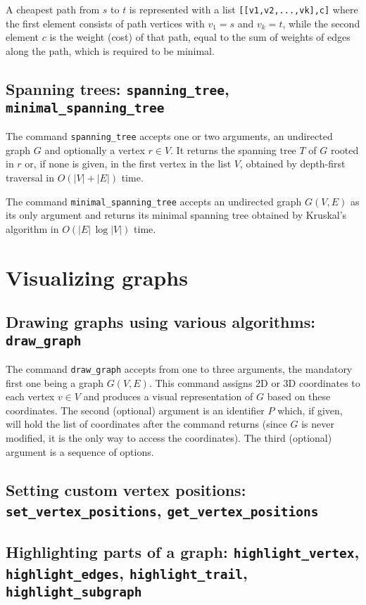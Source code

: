\documentclass[a4paper,11pt]{article}
\begin{document}
A cheapest path from $ s $ to $ t $ is represented with a list {\tt [[v1,v2,...,vk],c]} where the first element consists of path vertices with $ v_1=s $ and $ v_k=t $, while the second element $ c $ is the weight (cost) of that path, equal to the sum of weights of edges along the path, which is required to be minimal.

\subsection{Spanning trees: {\tt spanning\_tree}, {\tt minimal\_spanning\_tree}}

The command {\tt spanning\_tree} accepts one or two arguments, an undirected graph $ G $ and optionally a vertex $ r\in V $. It returns the spanning tree $ T $ of $ G $ rooted in $ r $ or, if none is given, in the first vertex in the list $ V $, obtained by depth-first traversal in $ O(|V|+|E|) $ time.

The command {\tt minimal\_spanning\_tree} accepts an undirected graph $ G(V,E) $ as its only argument and returns its minimal spanning tree obtained by Kruskal's algorithm in $ O(|E|\,\log|V|) $ time.

\section{Visualizing graphs}

\subsection{Drawing graphs using various algorithms: {\tt draw\_graph}}

The command {\tt draw\_graph} accepts from one to three arguments, the mandatory first one being a graph $ G(V,E) $. This command assigns 2D or 3D coordinates to each vertex $ v\in V $ and produces a visual representation of $ G $ based on these coordinates. The second (optional) argument is an identifier $ P $ which, if given, will hold the list of coordinates after the command returns (since $ G $ is never modified, it is the only way to access the coordinates). The third (optional) argument is a sequence of options.

\subsection{Setting custom vertex positions: {\tt set\_vertex\_positions}, {\tt get\_vertex\_positions}}

\subsection{Highlighting parts of a graph: {\tt highlight\_vertex}, {\tt highlight\_edges}, {\tt highlight\_trail}, {\tt highlight\_subgraph}}
\end{document}
